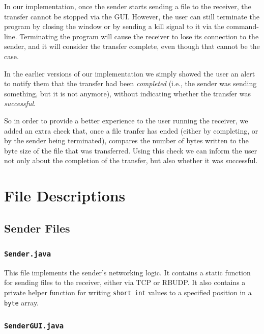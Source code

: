 \documentclass[10pt, a4paper]{article}
\begin{document}
In our implementation, once the sender starts sending a file to the receiver,
the transfer cannot be stopped via the GUI. However, the user can still
terminate the program by closing the window or by sending a kill signal to it
via the command-line. Terminating the program will cause the receiver to lose
its connection to the sender, and it will consider the transfer complete, even
though that cannot be the case.

In the earlier versions of our implementation we simply showed the user an alert
to notify them that the transfer had been \emph{completed} (i.e., the sender was
sending something, but it is not anymore), without indicating whether the
transfer was \emph{successful}. 

So in order to provide a better experience to the user running the receiver, we
added an extra check that, once a file tranfer has ended (either by completing,
or by the sender being terminated), compares the number of bytes written to the
byte size of the file that was transferred. Using this check we can inform the
user not only about the completion of the transfer, but also whether it was
successful.


\section{File Descriptions}
\label{sec:file-desc}

\subsection{Sender Files}
\label{subsec:sender-file-desc}

\subsubsection{\texttt{Sender.java}}
\label{subsubsec:send.java}

This file implements the sender's networking logic. It contains a static
function for sending files to the receiver, either via TCP or RBUDP. It also
contains a private helper function for writing \texttt{short int} values to a
specified position in a \texttt{byte} array.

\subsubsection{\texttt{SenderGUI.java}}
\label{subsubsec:send-gui.java}
\end{document}
